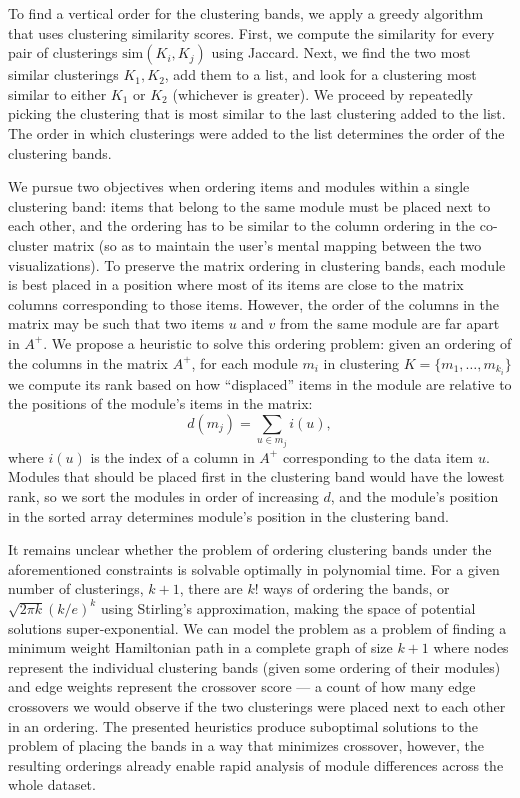 \documentclass[12pt]{cmuthesis}
\begin{document}

  To find a vertical order for the clustering bands, we apply a greedy algorithm that uses clustering similarity scores. First, we compute the similarity for every pair of clusterings $\textrm{sim}(K_{i}, K_{j})$ using Jaccard. Next, we find the two most similar clusterings $K_{1}, K_{2}$, add them to a list, and look for a clustering most similar to either $K_{1}$ or $K_{2}$ (whichever is greater). We proceed by repeatedly picking the clustering that is most similar to the last clustering added to the list. The order in which clusterings were added to the list determines the order of the clustering bands.


  We pursue two objectives when ordering items and modules within a single clustering band: items that belong to the same module must be placed next to each other, and the ordering has to be similar to the column ordering in the co-cluster matrix (so as to maintain the user's mental mapping between the two visualizations). To preserve the matrix ordering in clustering bands, each module is best placed in a position where most of its items are close to the matrix columns corresponding to those items. However, the order of the columns in the matrix may be such that two items $u$ and $v$ from the same module are far apart in $A^{+}$. We propose a heuristic to solve this ordering problem: given an ordering of the columns in the matrix $A^{+}$, for each module $m_{i}$ in clustering $K = \{m_{1}, \ldots, m_{k_{i}}\}$ we compute its rank based on how ``displaced'' items in the module are relative to the positions of the module's items in the matrix: 
  \[
   d(m_{j}) = \sum_{u \in m_{j}} i(u),
  \]
  where $i(u)$ is the index of a column in $A^{+}$ corresponding to the data item $u$. Modules that should be placed first in the clustering band would have the lowest rank, so we sort the modules in order of increasing $d$, and the module's position in the sorted array determines module's position in the clustering band.


  It remains unclear whether the problem of ordering clustering bands under the aforementioned constraints is solvable optimally in polynomial time. For a given number of clusterings, $k+1$, there are $k!$ ways of ordering the bands, or $\sqrt{2\pi k } (k / e)^k $ using Stirling's approximation, making the space of potential solutions super-exponential. We can model the problem as a problem of finding a minimum weight Hamiltonian path in a complete graph of size $k+1$ where nodes represent the individual clustering bands (given some ordering of their modules) and edge weights represent the crossover score --- a count of how many edge crossovers we would observe if the two clusterings were placed next to each other in an ordering. The presented heuristics produce suboptimal solutions to the problem of placing the bands in a way that minimizes crossover, however, the resulting orderings already enable rapid analysis of module differences across the whole dataset.
\end{document}
